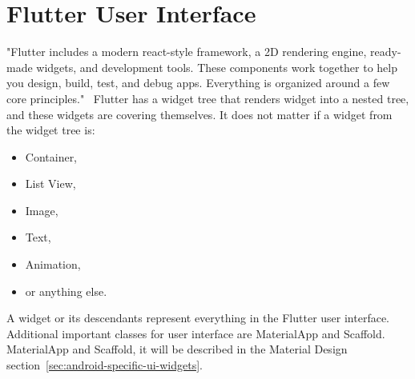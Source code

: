 \section{Flutter User Interface}\label{sec:flutter-user-interface}
"Flutter includes a modern react-style framework, a 2D rendering engine, ready-made widgets, and development tools.
These components work together to help you design, build, test, and debug apps.
Everything is organized around a few core principles."~\cite{flutterTechnicalOverview}
Flutter has a widget tree that renders widget into a nested tree, and these widgets are covering themselves.
It does not matter if a widget from the widget tree is:
\begin{itemize}
    \item Container,
    \item List View,
    \item Image,
    \item Text,
    \item Animation,
    \item or anything else.
\end{itemize}
A widget or its descendants represent everything in the Flutter user interface.
Additional important classes for user interface are MaterialApp and Scaffold.~\cite{flutterBook}
MaterialApp and Scaffold, it will be described in the Material Design section~\ref{sec:android-specific-ui-widgets}.

